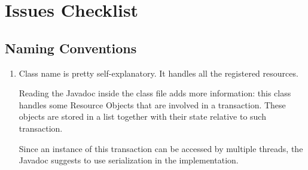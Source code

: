 \section{Issues Checklist}
\subsection{Naming Conventions}
\begin{enumerate}
	\item Class name is pretty self-explanatory. It handles all the registered resources.
	
	Reading the Javadoc inside the class file adds more information: this class handles some Resource Objects that are involved in a transaction. These objects are stored in a list together with their state relative to such transaction.
	
	Since an instance of this transaction can be accessed by multiple threads, the Javadoc suggests to use serialization in the implementation.
	

\end{enumerate}

